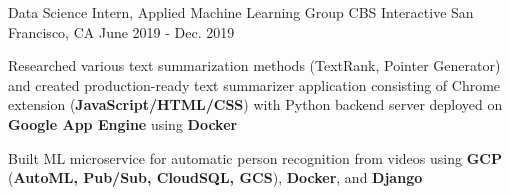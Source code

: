 \begin{cventries}
\cventry
    {Data Science Intern, Applied Machine Learning Group} %
    {CBS Interactive} %
    {San Francisco, CA} %
    {June 2019 - Dec. 2019} %
    {
      \begin{cvitems} %
 		\item {Researched various text summarization methods (TextRank, Pointer Generator) and created production-ready text summarizer application consisting of Chrome extension (\textbf{JavaScript/HTML/CSS}) with Python backend server deployed on \textbf{Google App Engine} using \textbf{Docker}}
  		\item {Built ML microservice for automatic person recognition from videos using \textbf{GCP} (\textbf{AutoML, Pub/Sub, CloudSQL, GCS}), \textbf{Docker}, and \textbf{Django}}
      \end{cvitems}
    }


\end{cventries}
